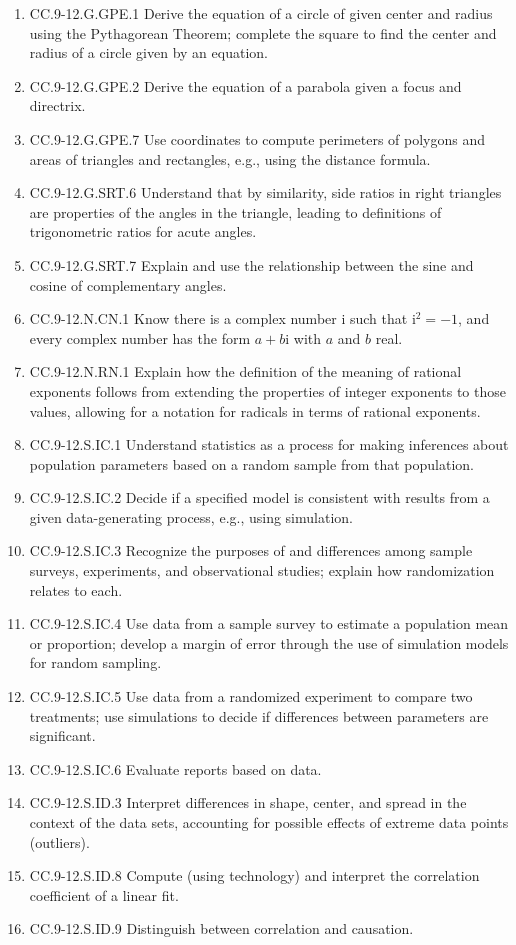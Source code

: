 \documentclass{article}
\begin{document}
\begin{enumerate}
	\item CC.9-12.G.GPE.1  Derive the equation of a circle of given center and radius using the Pythagorean Theorem; complete the square to find the center and radius of a circle given by an equation.
	\item CC.9-12.G.GPE.2 Derive the equation of a parabola given a focus and directrix.
	\item CC.9-12.G.GPE.7  Use coordinates to compute perimeters of polygons and areas of triangles and rectangles, e.g., using the distance formula.
	\item CC.9-12.G.SRT.6 Understand that by similarity, side ratios in right triangles are properties of the angles in the triangle, leading to definitions of trigonometric ratios for acute angles.
	\item CC.9-12.G.SRT.7  Explain and use the relationship between the sine and cosine of complementary angles.
	\item CC.9-12.N.CN.1 Know there is a complex number i such that $\textrm{i}^2 =-1$, and every complex number has the form $a + b\textrm{i}$ with $a$ and $b$ real.  
	\item CC.9-12.N.RN.1 Explain how the definition of the meaning of rational exponents follows from extending the properties of integer exponents to those values, allowing for a notation for radicals in terms of rational exponents. 
	\item CC.9-12.S.IC.1  Understand statistics as a process for making inferences about population parameters based on a random sample from that population.
	\item CC.9-12.S.IC.2  Decide if a specified model is consistent with results from a given data-generating process, e.g., using simulation. 
	\item CC.9-12.S.IC.3  Recognize the purposes of and differences among sample surveys, experiments, and observational studies; explain how randomization relates to each.
	\item CC.9-12.S.IC.4  Use data from a sample survey to estimate a population mean or proportion; develop a margin of error through the use of simulation models for random sampling.
	\item CC.9-12.S.IC.5  Use data from a randomized experiment to compare two treatments; use simulations to decide if differences between parameters are significant.
	\item CC.9-12.S.IC.6  Evaluate reports based on data.
	\item CC.9-12.S.ID.3 Interpret differences in shape, center, and spread in the context of the data sets, accounting for possible effects of extreme data points (outliers).
	\item CC.9-12.S.ID.8  Compute (using technology) and interpret the correlation coefficient of a linear fit.
	\item CC.9-12.S.ID.9  Distinguish between correlation and causation.
\end{enumerate}
\end{document}
